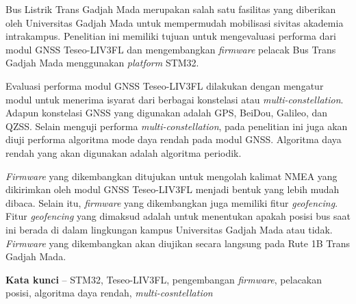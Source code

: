 Bus Listrik Trans Gadjah Mada merupakan salah satu fasilitas yang diberikan oleh Universitas Gadjah Mada untuk mempermudah mobilisasi sivitas akademia intrakampus. Penelitian ini memiliki tujuan untuk mengevaluasi performa dari modul GNSS Teseo-LIV3FL dan mengembangkan \textit{firmware} pelacak Bus Trans Gadjah Mada menggunakan \textit{platform} STM32.

Evaluasi performa modul GNSS Teseo-LIV3FL dilakukan dengan mengatur modul untuk menerima isyarat dari berbagai konstelasi atau \textit{multi-constellation}. Adapun konstelasi GNSS yang digunakan adalah GPS, BeiDou, Galileo, dan QZSS. Selain menguji performa \textit{multi-constellation}, pada penelitian ini juga akan diuji performa algoritma mode daya rendah pada modul GNSS. Algoritma daya rendah yang akan digunakan adalah algoritma periodik.

\textit{Firmware} yang dikembangkan ditujukan untuk mengolah kalimat NMEA yang dikirimkan oleh modul GNSS Teseo-LIV3FL menjadi bentuk yang lebih mudah dibaca. Selain itu, \textit{firmware} yang dikembangkan juga memiliki fitur \textit{geofencing}. Fitur \textit{geofencing} yang dimaksud adalah untuk menentukan apakah posisi bus saat ini berada di dalam lingkungan kampus Universitas Gadjah Mada atau tidak. \textit{Firmware} yang dikembangkan akan diujikan secara langsung pada Rute 1B Trans Gadjah Mada.

\noindent\textbf{Kata kunci} -- STM32, Teseo-LIV3FL, pengembangan \textit{firmware}, pelacakan posisi, algoritma daya rendah, \textit{multi-cosntellation}